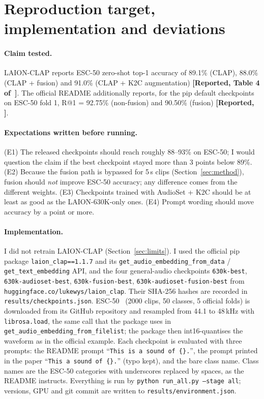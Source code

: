 \section{Reproduction target, implementation and deviations}
\label{sec:repro}

\paragraph{Claim tested.}
LAION-CLAP reports ESC-50 zero-shot top-1 accuracy of 89.1\% (CLAP), 88.0\% (CLAP + fusion) and 91.0\% (CLAP + K2C augmentation)
\textbf{[Reported, Table 4 of~\cite{wu2023laionclap}]}. The official README additionally reports, for the pip default checkpoints on
ESC-50 fold 1, R@1 = 92.75\% (non-fusion) and 90.50\% (fusion) \textbf{[Reported, \cite{laionclapgithub}]}.

\paragraph{Expectations written before running.}
(E1) The released checkpoints should reach roughly 88--93\% on ESC-50; I would question the claim if the best checkpoint stayed more than 3 points below 89\%.
(E2) Because the fusion path is bypassed for 5\,s clips (Section~\ref{sec:method}), fusion should \emph{not} improve ESC-50 accuracy; any difference comes from the different weights.
(E3) Checkpoints trained with AudioSet + K2C should be at least as good as the LAION-630K-only ones.
(E4) Prompt wording should move accuracy by a point or more.

\paragraph{Implementation.}
I did not retrain LAION-CLAP (Section~\ref{sec:limits}). I used the official pip package \texttt{laion\_clap==1.1.7} and its
\texttt{get\_audio\_embedding\_from\_data} / \texttt{get\_text\_embedding} API, and the four general-audio checkpoints
\texttt{630k-best}, \texttt{630k-audioset-best}, \texttt{630k-fusion-best}, \texttt{630k-audioset-fusion-best}
from \texttt{huggingface.co/lukewys/laion\_clap}. Their SHA-256 hashes are recorded in \texttt{results/checkpoints.json}.
ESC-50~\cite{piczak2015esc} (2000 clips, 50 classes, 5 official folds) is downloaded from its GitHub repository and resampled from
44.1 to 48\,kHz with \texttt{librosa.load}, the same call that the package uses in \texttt{get\_audio\_embedding\_from\_filelist};
the package then int16-quantises the waveform as in the official example.
Each checkpoint is evaluated with three prompts: the README prompt ``\texttt{This is a sound of \{\}.}'', the prompt printed in the paper
``\texttt{This a sound of \{\}.}'' (typo kept), and the bare class name. Class names are the ESC-50 categories with underscores replaced by spaces, as the README instructs.
Everything is run by \texttt{python run\_all.py --stage all}; versions, GPU and git commit are written to \texttt{results/environment.json}.


